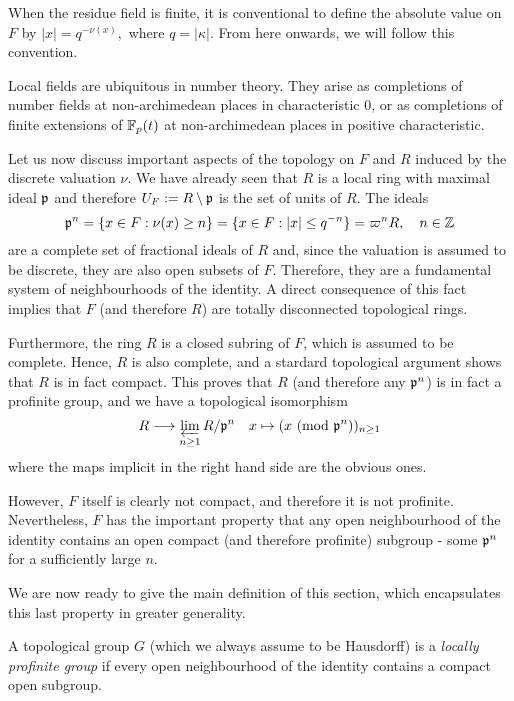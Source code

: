 \begin{rem}
    When the residue field is finite, it is conventional to define the absolute value on $F$ by 
    $|x|=q^{-\nu(x)},$
    where $q=|\kappa|$. From here onwards, we will follow this convention.
\end{rem}
\begin{rem}
    Local fields are ubiquitous in number theory. They arise as completions of number fields at non-archimedean places in characteristic 0, or as completions of finite extensions of $\mathbb{F}_p(t)$ at non-archimedean places in positive characteristic.
\end{rem}

Let us now discuss important aspects of the topology on $F$ and $R$ induced by the discrete valuation $\nu$. We have already seen that $R$ is a local ring with maximal ideal $\mathfrak{p}$ and therefore $U_F:=R\setminus\mathfrak{p}$ is the set of units of $R$. The ideals 
$$\mathfrak{p}^n=\{x\in F:\nu(x)\geq n\}=\{x\in F: |x|\leq q^{-n}\}=\varpi^n R,\quad n\in\mathbb{Z}$$
are a complete set of fractional ideals of $R$ and, since the valuation is assumed to be discrete, they are also open subsets of $F$.
Therefore, they are a fundamental system of neighbourhoods of the identity. A direct consequence of this fact implies that $F$ (and therefore $R$) are totally disconnected topological rings.

Furthermore, the ring $R$ is a closed subring of $F$, which is assumed to be complete. Hence, $R$ is also complete, and a stardard topological argument shows that $R$ is in fact compact. This proves that $R$ (and therefore any $\mathfrak{p}^n$) is in fact a profinite group, and we have a topological isomorphism 
$$R\longrightarrow\varprojlim_{n\geq 1} R/\mathfrak{p}^n\quad x\mapsto (x\ (\textrm{mod }{\mathfrak{p}^n}))_{n\geq 1}$$
where the maps implicit in the right hand side are the obvious ones.

However, $F$ itself is clearly not compact, and therefore it is not profinite. Nevertheless, $F$ has the important property that any open neighbourhood of the identity contains an open compact (and therefore profinite) subgroup - some $\mathfrak{p}^n$ for a sufficiently large $n$.

We are now ready to give the main definition of this section, which encapsulates this last property in greater generality.

\begin{defn}\label{loc_prof_grp}
    A topological group $G$ (which we always assume to be Hausdorff) is a \textit{locally profinite group} if every open neighbourhood of the identity contains a compact open subgroup. 
\end{defn}

